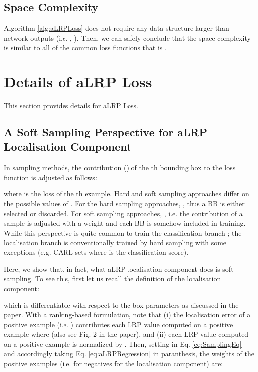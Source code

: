 \documentclass{article}
\begin{document}
\subsection{Space Complexity} 
Algorithm \ref{alg:aLRPLoss} does not require any data structure larger than network outputs (i.e. , ). Then, we can safely conclude that the space complexity is similar to all of the common loss functions that is .



\section{Details of aLRP Loss}
\label{sec:aLRP}
This section provides details for aLRP Loss.

\subsection{A Soft Sampling Perspective for aLRP Localisation Component}
In sampling methods, the contribution () of the th bounding box to the loss function is adjusted as follows:

where  is the loss of the th example. Hard and soft sampling approaches differ on the possible values of . For the hard sampling approaches, , thus a BB is either selected or discarded. For soft sampling approaches, , i.e. the contribution of a sample is adjusted with a weight and each BB is somehow included in training. While this perspective is quite common to train the classification branch \cite{PrimeSample,FocalLoss}; the localisation branch is conventionally trained by hard sampling with some exceptions (e.g. CARL \cite{PrimeSample} sets  where  is the classification score).

Here, we show that, in fact, what aLRP localisation component does is soft sampling. To see this, first let us recall the definition of the localisation component: 

which is differentiable with respect to the box parameters as discussed in the paper. With a ranking-based formulation, note that (i) the localisation error of a positive example  (i.e. ) contributes each LRP value computed on a positive example  where  (also see Fig. 2 in the paper), and (ii) each LRP value computed on a positive example  is normalized by . Then, setting  in Eq. \ref{eq:SamplingEq} and accordingly taking Eq. \ref{eq:aLRPRegression} in  paranthesis, the weights of the positive examples (i.e.  for negatives for the localisation component) are:
\end{document}
